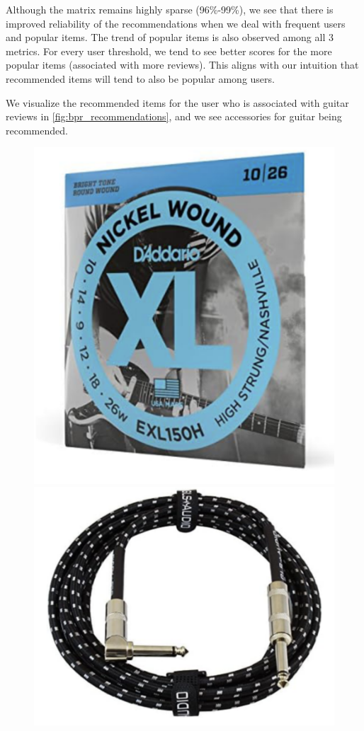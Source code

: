 \documentclass{article}
\begin{document}
Although the matrix remains highly sparse (96\%-99\%), we see that there is improved reliability of the recommendations when we deal with frequent users and popular items. The trend of popular items is also observed among all 3 metrics. For every user threshold, we tend to see better scores for the more popular items (associated with more reviews). This aligns with our intuition that recommended items will tend to also be popular among users.

We visualize the recommended items for the user who is associated with guitar reviews in \ref{fig:bpr_recommendations}, and we see accessories for guitar being recommended.
\begin{figure}[h]
\centering
\begin{minipage}{.3\textwidth}
  \centering
  \includegraphics[width=.9\linewidth]{DSC210_Project_Report/images/recommendation1.png}
\end{minipage}%
\begin{minipage}{.3\textwidth}
  \centering
  \includegraphics[width=.9\linewidth]{DSC210_Project_Report/images/recommendation2.png}

\end{minipage}
\end{figure}
\end{document}
